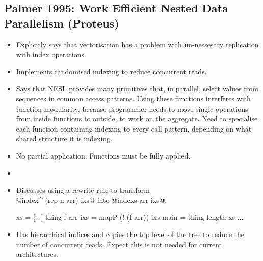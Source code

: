 \subsection{
        \cite{Palmer:work-efficient-nested-data-parallelism}
        Palmer 1995: Work Efficient Nested Data Parallelism (Proteus) }
\begin{itemize}
\item	Explicitly says that vectorisation has a problem with un-nessesary replication with index operations.

\item	Implements randomised indexing to reduce concurrent reads.

\item	Says that NESL provides many primitives that, in parallel, select values from sequences in common access patterns. Using these functions interferes with function modularity, because programmer needs to move single operations from inside functions to outside, to work on the aggregate. Need to specialise each function containing indexing to every call pattern, depending on what shared structure it is indexing.

\item	No partial application. Functions must be fully applied.

\item	{}

\item	Discusses using a rewrite rule to transform \\ @index^ (rep n arr) ixs@ into @indexs arr ixs@. 

\begin{code}
xs  = [...]
thing f arr ixs = mapP (! (f arr)) ixs
main            = thing length xs ...
\end{code}

\item	Has hierarchical indices and copies the top level of the tree to reduce the number of concurrent reads. Expect this is not needed for current architectures.


\end{itemize}
